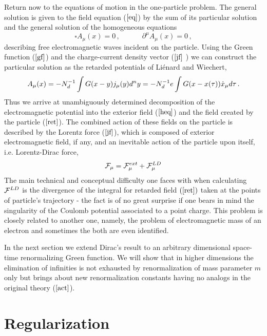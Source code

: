\documentclass[a4paper,12pt]{article}
\begin{document}
Return now to the equations of motion in the one-particle problem. The
general solution is given to the field equation ($\ref{eq}$) by the sum of
its particular solution and the general solution of the homogeneous
equations
\begin{equation}  \label{heq}
\square A_{\mu}(x)=0\,,\;\;\;\;\;\;\;\;\;\;\; \partial^\mu A_\mu(x)=0\,,
\end{equation}
describing free electromagnetic waves incident on the particle. Using the
Green function ($\ref{gf}$) and the charge-current density vector ($\ref{jf}$%
) we can construct the particular solution as the retarded potentials of
Li\'enard and Wiechert,
\begin{equation}  \label{ret}
A_\mu(x)=-N^{-1}_d\int G(x-y)j_\mu(y)d^ny =-N_d^{-1} e\int G(x-x(\tau ))\dot{%
x}_\mu d\tau\,.
\end{equation}
Thus we arrive at unambiguously determined decomposition of the
electromagnetic potential into the exterior field ($\ref{heq}$) and the
field created by the particle ($\ref{ret}$). The combined action of these
fields on the particle is described by the Lorentz force ($\ref{jf}$), which
is composed of exterior electromagnetic field, if any, and an inevitable
action of the particle upon itself, i.e. Lorentz-Dirac force,
\begin{equation*}
{\cal F}_\mu={\cal {F}}^{ext}_\mu+{\cal F}^{LD}_\mu
\end{equation*}
The main technical and conceptual difficulty one faces with when calculating
${\cal F}^{LD}$ is the divergence of the integral for retarded field $(\ref
{ret})$ taken at the points of particle's trajectory - the fact is of no
great surprise if one bears in mind the singularity of the Coulomb potential
associated to a point charge. This problem is closely related to another
one, namely, the problem of electromagnetic mass of an electron and
sometimes the both are even identified.

In the next section we extend Dirac's result to an arbitrary dimensional
space-time renormalizing Green function. We will show that in higher
dimensions the elimination of infinities is not exhausted by renormalization
of mass parameter $m$ only but brings about new renormalization constants
having no analogs in the original theory ($\ref{act}$).

\section{ Regularization}
\end{document}
